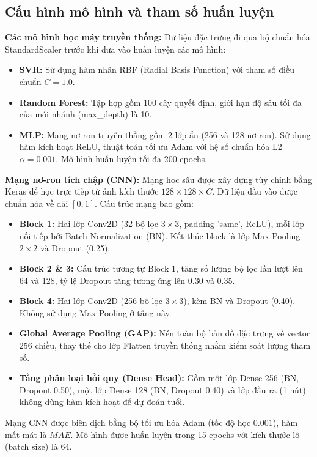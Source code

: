 \subsection{Cấu hình mô hình và tham số huấn luyện}
\textbf{Các mô hình học máy truyền thống:}
Dữ liệu đặc trưng đi qua bộ chuẩn hóa StandardScaler trước khi đưa vào huấn luyện các mô hình:
\begin{itemize}
    \item \textbf{SVR:} Sử dụng hàm nhân RBF (Radial Basis Function) với tham số điều chuẩn $C=1.0$. 
    \item \textbf{Random Forest:} Tập hợp gồm 100 cây quyết định, giới hạn độ sâu tối đa của mỗi nhánh (max\_depth) là 10.
    \item \textbf{MLP:} Mạng nơ-ron truyền thẳng gồm 2 lớp ẩn (256 và 128 nơ-ron). Sử dụng hàm kích hoạt ReLU, thuật toán tối ưu Adam với hệ số chuẩn hóa L2 $\alpha=0.001$. Mô hình huấn luyện tối đa 200 epochs.
\end{itemize}

\textbf{Mạng nơ-ron tích chập (CNN):}
Mạng học sâu được xây dựng tùy chỉnh bằng Keras để học trực tiếp từ ảnh kích thước $128 \times 128 \times C$. Dữ liệu đầu vào được chuẩn hóa về dải $[0, 1]$. Cấu trúc mạng bao gồm:
\begin{itemize}
    \item \textbf{Block 1:} Hai lớp Conv2D (32 bộ lọc $3 \times 3$, padding 'same', ReLU), mỗi lớp nối tiếp bởi Batch Normalization (BN). Kết thúc block là lớp Max Pooling $2 \times 2$ và Dropout (0.25).
    \item \textbf{Block 2 \& 3:} Cấu trúc tương tự Block 1, tăng số lượng bộ lọc lần lượt lên 64 và 128, tỷ lệ Dropout tăng tương ứng lên 0.30 và 0.35.
    \item \textbf{Block 4:} Hai lớp Conv2D (256 bộ lọc $3 \times 3$), kèm BN và Dropout (0.40). Không sử dụng Max Pooling ở tầng này.
    \item \textbf{Global Average Pooling (GAP):} Nén toàn bộ bản đồ đặc trưng về vector 256 chiều, thay thế cho lớp Flatten truyền thống nhằm kiểm soát lượng tham số.
    \item \textbf{Tầng phân loại hồi quy (Dense Head):} Gồm một lớp Dense 256 (BN, Dropout 0.50), một lớp Dense 128 (BN, Dropout 0.40) và lớp đầu ra (1 nút) không dùng hàm kích hoạt để dự đoán tuổi.
\end{itemize}
Mạng CNN được biên dịch bằng bộ tối ưu hóa Adam (tốc độ học $0.001$), hàm mất mát là $MAE$. Mô hình được huấn luyện trong 15 epochs với kích thước lô (batch size) là 64. 

